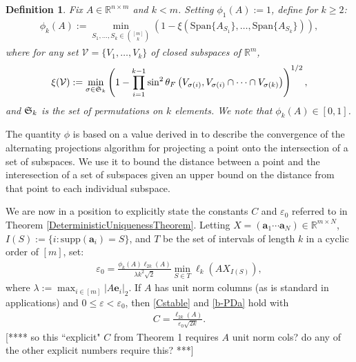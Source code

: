 \documentclass[journal, onecolumn]{IEEEtran}
\newtheorem{definition}{Definition}
\begin{document}
\begin{definition}\label{SpecialSupportSet}
Fix $A \in \mathbb{R}^{n \times m}$ and $k < m$. Setting $\phi_1(A) := 1$, define for $k \geq 2$:
\begin{align}\label{rho}
\phi_k(A) := \min_{ S_1,\ldots,S_k \in {[m] \choose k} } \left(1 - \xi( \text{Span}\{A_{S_1}\}, \ldots,  \text{Span}\{A_{S_k}\}) \right),
\end{align}
where for any set $\mathcal{V} = \{V_1, \ldots, V_k\}$ of closed subspaces of $\mathbb{R}^m$, 
\begin{align}
\xi(\mathcal{V}) := \min_{\sigma \in \frak{S}_k} \left(1 - \prod_{i=1}^{k-1} \sin^2  \theta_F \left(V_{\sigma(i)}, V_{\sigma(i)} \cap \cdots \cap V_{\sigma(k)}\right)  \right)^{1/2},
\end{align}
%
and $\frak{S}_k$ is the set of permutations on $k$ elements. We note that $\phi_k(A) \in [0,1]$.
\end{definition}

The quantity $\phi$ is based on a value derived in \cite{Deutsch} to describe the convergence of the alternating projections algorithm for projecting a point onto the intersection of a set of subspaces. We use it to bound the distance between a point and the interesection of a set of subspaces given an upper bound on the distance from that point to each individual subspace. 


We are now in a position to explicitly state the constants $C$ and $\varepsilon_0$ referred to in Theorem \ref{DeterministicUniquenessTheorem}. Letting $X  = (\mathbf{a}_1 \cdots \mathbf{a}_N) \in \mathbb{R}^{m \times N}$, $I(S) := \{i : \text{supp}(\mathbf{a}_i) = S\}$, and $T$ be the set of intervals of length $k$ in a cyclic order of $[m]$, set:
\begin{align}\label{epsilon0}
\varepsilon_0 = \frac{ \phi_k(A) \ell_{2k}(A) }{\lambda k^2 \sqrt{2}} \min_{S \in T} \ell_k(AX_{I(S)}),
\end{align}
%
where $\lambda := \max_{i \in [m]} |A\mathbf{e}_i|_2 $. If $A$ has unit norm columns (as is standard in applications) and $0 \leq \varepsilon < \varepsilon_0$, then \eqref{Cstable} and \eqref{b-PDa} hold with
\begin{align}\label{Cdef}
C = \frac{\ell_{2k}(A)}{ \varepsilon_0 \sqrt{2k}}.
\end{align}
[**** so this ``explicit" $C$ from Theorem 1 requires $A$ unit norm cols? do any of the other explicit numbers require this? ***]
\end{document}
